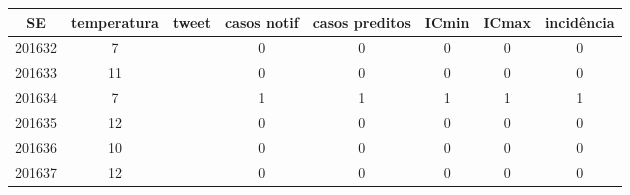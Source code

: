 \begin{tabular}{c|ccccccc}
  \hline
SE & temperatura & tweet & casos notif & casos preditos & ICmin & ICmax & incidência \\ 
  \hline
201632 & 7 &  & 0 & 0 & 0 & 0 & 0 \\ 
  201633 & 11 &  & 0 & 0 & 0 & 0 & 0 \\ 
  201634 & 7 &  & 1 & 1 & 1 & 1 & 1 \\ 
  201635 & 12 &  & 0 & 0 & 0 & 0 & 0 \\ 
  201636 & 10 &  & 0 & 0 & 0 & 0 & 0 \\ 
  201637 & 12 &  & 0 & 0 & 0 & 0 & 0 \\ 
   \hline
\end{tabular}
